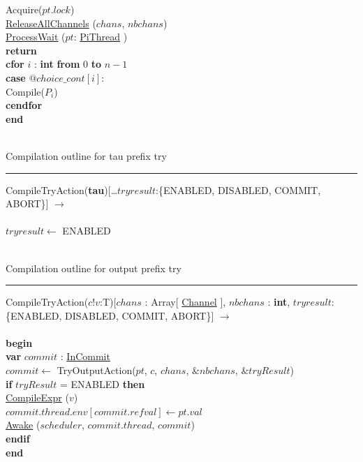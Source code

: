 \documentclass[a4paper,11pt]{article}
\newenvironment{program}{
  \begin{sffamily}
  \begin{scriptsize}
  \begin{tabbing}}
 {\end{tabbing}
  \end{scriptsize}
  \end{sffamily}}
\newcommand{\kw}[1]{\textsf{\textbf{#1}}}
\newcommand{\pindent}{\hspace{2em}\=}
\newcommand{\compiletime}[1]{\textcolor{compilecolor}{#1}}
\newcommand{\synchro}[1]{\textcolor{synchrocolor}{#1}}
\newcommand{\algotitle}[1]{\noindent\\ \noindent#1\par\nobreak\vspace{3pt}\hrule\vspace{6pt}}
\newcommand{\algosection}[1]{
  \phantomsection
  \algotitle{#1}
}
\newcommand{\myref}[1]{
  \hyperref[#1]{#1}
}
\begin{document}
\begin{program}
  \>\synchro{Acquire($pt.lock$)} \\
  \>\synchro{\myref{ReleaseAllChannels}($chans$, $nbchans$)} \\
  \>\synchro{\myref{ProcessWait}($pt$:\myref{PiThread})} \\
  \>\kw{return} \\
  \>\compiletime{\kw{cfor} $i$ : \kw{int} \kw{from} $0$ \kw{to} $n-1$} \\
  \>\pindent \kw{case} $@choice\_cont[i]:$ \\
  \>\>\compiletime{Compile($P_i$)} \\
  \>\compiletime{\kw{cendfor}} \\
  \kw{end}
\end{program}

\label{CompileTryAction}
\algosection{Compilation outline for tau prefix try}
\begin{program}
  \compiletime{CompileTryAction(\kw{tau})}[\ldots $tryresult$:\{ENABLED, DISABLED, COMMIT, ABORT\}] $\rightarrow$ \\ \\
  $tryresult \leftarrow$ ENABLED \\
\end{program}

\algosection{Compilation outline for output prefix try}
\begin{program}
  \compiletime{CompileTryAction($c!v$:T)}[$chans$ : Array[\myref{Channel}], $nbchans$ : \kw{int}, $tryresult$:\{ENABLED, DISABLED, COMMIT, ABORT\}] $\rightarrow$ \\ \\
  \kw{begin} \\
  \pindent\kw{var} $commit$ : \myref{InCommit} \\
  \> $commit \leftarrow$ TryOutputAction($pt$, $c$, $chans$, $\&nbchans$, $\& tryResult$)\\
  \>\kw{if} $tryResult$ = ENABLED \kw{then} \\
  \>\pindent\compiletime{\myref{CompileExpr}($v$)} \\
  \>\>$commit.thread.env[commit.refval] \leftarrow pt.val$ \\
  \>\>\myref{Awake}($scheduler$, $commit.thread$, $commit$) \\
  \> \kw{endif}\\
  \kw{end}
\end{program}
\end{document}
